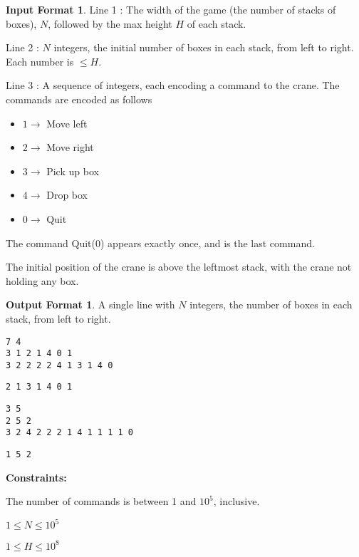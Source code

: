 \documentclass[twoside,12pt,a4paper,english]{book}
\theoremstyle{definition}
\theoremstyle{problemstyle}
\theoremstyle{problemstyle}
\newtheorem*{input_st}{Input Format} %
\theoremstyle{problemstyle}
\newtheorem*{output_st}{Output Format} %
\begin{document}
\begin{input_st}
Line 1 : The width of the game (the number of stacks of boxes), $N$, followed by the max height $H$ of each stack.

Line 2 : $N$ integers, the initial number of boxes in each stack, from left to right. Each number is $\leq H$.

Line 3 : A sequence of integers, each encoding a command to the crane. The commands are encoded as follows
\begin{itemize}
    \item $1 \rightarrow$ Move left
    \item $2 \rightarrow$ Move right
    \item $3 \rightarrow$ Pick up box
    \item $4 \rightarrow$ Drop box
    \item $0 \rightarrow$ Quit
\end{itemize}

The command Quit(0) appears exactly once, and is the last command.

The initial position of the crane is above the leftmost stack, with the crane not holding any box.
\end{input_st}

\begin{output_st}
A single line with $N$ integers, the number of boxes in each stack, from left to right.
\end{output_st}

\begin{tcolorbox}[title=Example]
\begin{lstlisting}
7 4
3 1 2 1 4 0 1
3 2 2 2 2 4 1 3 1 4 0
\end{lstlisting}
\tcblower
\begin{lstlisting}
2 1 3 1 4 0 1
\end{lstlisting}
\end{tcolorbox}

\begin{tcolorbox}[title=Example]
\begin{lstlisting}
3 5
2 5 2
3 2 4 2 2 2 1 4 1 1 1 1 0
\end{lstlisting}
\tcblower
\begin{lstlisting}
1 5 2 
\end{lstlisting}
\end{tcolorbox}

\textbf{Constraints:}
\begin{center}
    The number of commands is between 1 and $10^5$, inclusive.
    
    $1 \leq N \leq 10^5$
    
    $1 \leq H \leq 10^8$
\end{center}
\end{document}
